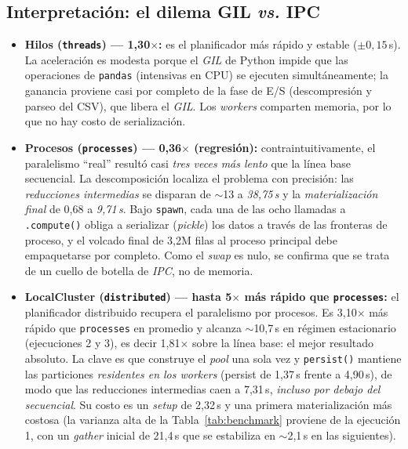 \documentclass[12pt,letterpaper]{article}
\begin{document}
\subsection{Interpretación: el dilema GIL \textit{vs.} IPC}
\begin{itemize}
    \item \textbf{Hilos (\texttt{threads}) — 1,30$\times$:} es el planificador más rápido y estable
    ($\pm 0,15$\,s). La aceleración es modesta porque el \textit{GIL} de Python impide que las
    operaciones de \texttt{pandas} (intensivas en CPU) se ejecuten simultáneamente; la ganancia
    proviene casi por completo de la fase de E/S (descompresión y parseo del CSV), que libera el
    \textit{GIL}. Los \textit{workers} comparten memoria, por lo que no hay costo de serialización.

    \item \textbf{Procesos (\texttt{processes}) — 0,36$\times$ (regresión):} contraintuitivamente,
    el paralelismo ``real'' resultó casi \textit{tres veces más lento} que la línea base secuencial.
    La descomposición localiza el problema con precisión: las \textit{reducciones intermedias} se
    disparan de $\sim$13 a \textit{38,75\,s} y la \textit{materialización final} de 0,68 a
    \textit{9,71\,s}. Bajo \texttt{spawn}, cada una de las ocho llamadas a \texttt{.compute()}
    obliga a serializar (\textit{pickle}) los datos a través de las fronteras de proceso, y el
    volcado final de 3,2M filas al proceso principal debe empaquetarse por completo. Como el
    \textit{swap} es nulo, se confirma que se trata de un cuello de botella de \textit{IPC}, no de
    memoria.

    \item \textbf{LocalCluster (\texttt{distributed}) — hasta 5$\times$ más rápido que
    \texttt{processes}:} el planificador distribuido recupera el paralelismo por procesos. Es
    3,10$\times$ más rápido que \texttt{processes} en promedio y alcanza $\sim$10,7\,s en régimen
    estacionario (ejecuciones 2 y 3), es decir 1,81$\times$ sobre la línea base: el mejor resultado
    absoluto. La clave es que construye el \textit{pool} una sola vez y \texttt{persist()} mantiene
    las particiones \textit{residentes en los workers} (persist de 1,37\,s frente a 4,90\,s), de modo
    que las reducciones intermedias caen a 7,31\,s, \textit{incluso por debajo del secuencial}. Su
    costo es un \textit{setup} de 2,32\,s y una primera materialización más costosa (la varianza alta
    de la Tabla~\ref{tab:benchmark} proviene de la ejecución 1, con un \textit{gather} inicial de
    21,4\,s que se estabiliza en $\sim$2,1\,s en las siguientes).
\end{itemize}
\end{document}
